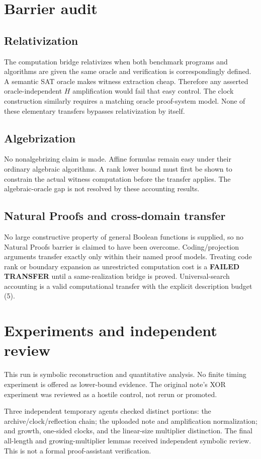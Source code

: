\documentclass[11pt]{article}
\begin{document}
\section*{Barrier audit}
\subsection*{Relativization}
The computation bridge relativizes when both benchmark programs and
algorithms are given the same oracle and verification is correspondingly
defined. A semantic SAT oracle makes witness extraction cheap.
Therefore any asserted oracle-independent $H$ amplification would fail
that easy control. The clock construction similarly requires a matching
oracle proof-system model. None of these elementary transfers bypasses
relativization by itself.

\subsection*{Algebrization}
No nonalgebrizing claim is made. Affine formulas remain easy under their
ordinary algebraic algorithms. A rank lower bound must first be shown to
constrain the actual witness computation before the transfer applies.
The algebraic-oracle gap is not resolved by these accounting results.

\subsection*{Natural Proofs and cross-domain transfer}
No large constructive property of general Boolean functions is supplied,
so no Natural Proofs barrier is claimed to have been overcome.
Coding/projection arguments transfer exactly only within their named
proof models. Treating code rank or boundary expansion as unrestricted
computation cost is a \textbf{FAILED TRANSFER} until a same-realization
bridge is proved. Universal-search accounting is a valid computational
transfer with the explicit description budget (5).

\section*{Experiments and independent review}
This run is symbolic reconstruction and quantitative analysis.
No finite timing experiment is offered as lower-bound evidence.
The original note's XOR experiment was reviewed as a hostile control,
not rerun or promoted.

Three independent temporary agents checked distinct portions:
the archive/clock/reflection chain; the uploaded note and amplification
normalization; and growth, one-sided clocks, and the linear-size
multiplier distinction. The final all-length and growing-multiplier
lemmas received independent symbolic review. This is not a formal
proof-assistant verification.
\end{document}
